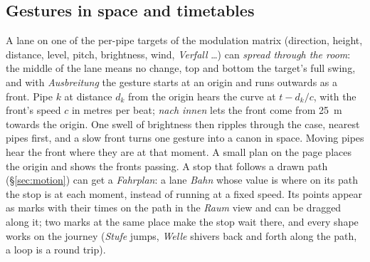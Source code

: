 \documentclass[11pt,a4paper,parskip=half,DIV=11,toc=bibliography]{scrartcl}
\newcommand{\ui}[1]{\emph{#1}}                 %
\begin{document}
\subsection{Gestures in space and timetables}
A lane on one of the per-pipe targets of the modulation matrix (direction, height, distance, level, pitch, brightness, wind, \ui{Verfall} \dots) can
\emph{spread through the room}: the middle of the lane means no change, top and bottom the target's full swing, and with \ui{Ausbreitung} the gesture
starts at an origin and runs outwards as a front. Pipe $k$ at distance $d_k$ from the origin hears the curve at $t-d_k/c$, with the front's speed
$c$ in metres per beat; \ui{nach innen} lets the front come from \SI{25}{m} towards the origin. One swell of brightness then ripples through the case,
nearest pipes first, and a slow front turns one gesture into a canon in space. Moving pipes hear the front where they are at that moment. A small plan
on the page places the origin and shows the fronts passing. A stop that follows a drawn path (\S\ref{sec:motion}) can get a \ui{Fahrplan}: a lane
\ui{Bahn} whose value is where on its path the stop is at each moment, instead of running at a fixed speed. Its points appear as marks with their times
on the path in the \ui{Raum} view and can be dragged along it; two marks at the same place make the stop wait there, and every shape works on the
journey (\ui{Stufe} jumps, \ui{Welle} shivers back and forth along the path, a loop is a round trip).
\end{document}
